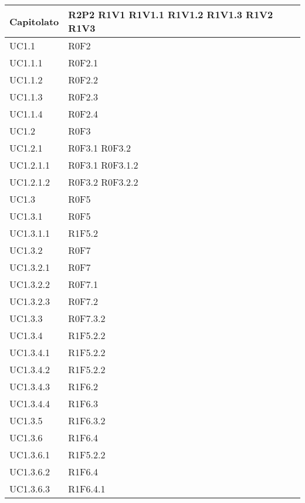 \begin{center}
\begin{longtable}{| p{4cm} | p{4cm} |}
		\hline
		Capitolato  &  R2P2 \newline R1V1 \newline R1V1.1 \newline R1V1.2 \newline R1V1.3 \newline R1V2 \newline R1V3 \\
		\hline

		UC1.1  &  R0F2 \\
		\hline
		UC1.1.1  &  R0F2.1 \\
		\hline
		UC1.1.2  &  R0F2.2 \\
		\hline
		UC1.1.3  &  R0F2.3 \\
		\hline
		UC1.1.4  &  R0F2.4 \\
		\hline
		UC1.2  &  R0F3 \\
		\hline
		UC1.2.1  &  R0F3.1 \newline R0F3.2 \\
		\hline
		UC1.2.1.1  &  R0F3.1 \newline R0F3.1.2 \\
		\hline
		UC1.2.1.2  &  R0F3.2 \newline R0F3.2.2 \\
		\hline
		UC1.3  &  R0F5 \\
		\hline
		UC1.3.1  &  R0F5 \\
		\hline
		UC1.3.1.1  &  R1F5.2 \\
		\hline
		UC1.3.2  &  R0F7 \\
		\hline
		UC1.3.2.1  &  R0F7 \\
		\hline
		UC1.3.2.2  &  R0F7.1 \\
		\hline
		UC1.3.2.3  &  R0F7.2 \\
		\hline
		UC1.3.3  &  R0F7.3.2 \\
		\hline
		UC1.3.4  &  R1F5.2.2 \\
		\hline
		UC1.3.4.1  &  R1F5.2.2 \\
		\hline
		UC1.3.4.2  &  R1F5.2.2 \\
		\hline
		UC1.3.4.3  &  R1F6.2 \\
		\hline
		UC1.3.4.4  &  R1F6.3 \\
		\hline
		UC1.3.5  &  R1F6.3.2 \\
		\hline
		UC1.3.6  &  R1F6.4 \\
		\hline
		UC1.3.6.1  &  R1F5.2.2 \\
		\hline
		UC1.3.6.2  &  R1F6.4 \\
		\hline
		UC1.3.6.3  &  R1F6.4.1 \\

\end{longtable}
\end{center}
